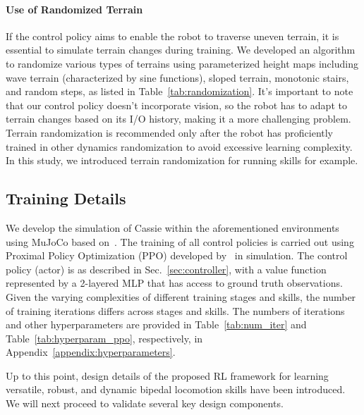 \paragraph{Use of Randomized Terrain}
If the control policy aims to enable the robot to traverse uneven terrain, it is essential to simulate terrain changes during training. 
We developed an algorithm to randomize various types of terrains using parameterized height maps including wave terrain (characterized by sine functions), sloped terrain, monotonic stairs, and random steps, as listed in Table~\ref{tab:randomization}. 
It's important to note that our control policy doesn't incorporate vision, so the robot has to adapt to terrain changes based on its I/O history, making it a more challenging problem.
Terrain randomization is recommended only after the robot has proficiently trained in other dynamics randomization to avoid excessive learning complexity. 
In this study, we introduced terrain randomization for running skills for example. 



\subsection{Training Details}
We develop the simulation of Cassie within the aforementioned environments using MuJoCo based on~\citep{todorov2012mujoco,cassiemj}. 
The training of all control policies is carried out using Proximal Policy Optimization (PPO) developed by~\citep{schulman2017proximal} in simulation.
The control policy (actor) is as described in Sec.~\ref{sec:controller}, with a value function represented by a 2-layered MLP that has access to ground truth observations.
Given the varying complexities of different training stages and skills, the number of training iterations differs across stages and skills. 
The numbers of iterations and other hyperparameters are provided in Table~\ref{tab:num_iter} and Table~\ref{tab:hyperparam_ppo}, respectively, in Appendix~\ref{appendix:hyperparameters}. 

Up to this point, design details of the proposed RL framework for learning versatile, robust, and dynamic bipedal locomotion skills have been introduced. 
We will next proceed to validate several key design components. 
